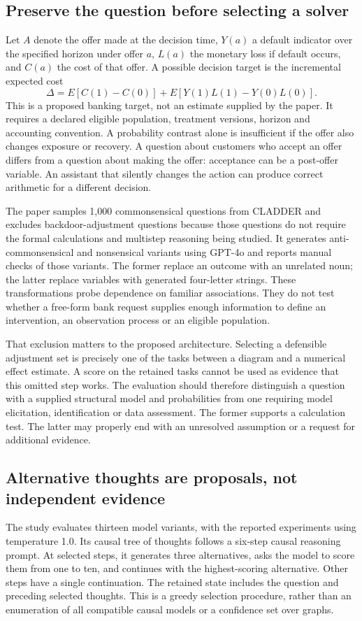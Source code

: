 \subsection{Preserve the question before selecting a solver}
\label{exec21:prophets-question}
Let $A$ denote the offer made at the decision time, $Y(a)$ a default indicator
over the specified horizon under offer $a$, $L(a)$ the monetary loss if default
occurs, and $C(a)$ the cost of that offer. A possible decision target is the
incremental expected cost
\[
 \Delta=E[C(1)-C(0)]+E[Y(1)L(1)-Y(0)L(0)].
\]
This is a proposed banking target, not an estimate supplied by the paper. It
requires a declared eligible population, treatment versions, horizon and
accounting convention. A probability contrast alone is insufficient if the
offer also changes exposure or recovery. A question about customers who accept
an offer differs from a question about making the offer: acceptance can be a
post-offer variable. An assistant that silently changes the action can produce
correct arithmetic for a different decision.

The paper samples 1,000 commonsensical questions from CLADDER and excludes
backdoor-adjustment questions because those questions do not require the
formal calculations and multistep reasoning being studied. It generates
anti-commonsensical and nonsensical variants using GPT-4o and reports manual
checks of those variants. The former replace an outcome with an unrelated
noun; the latter replace variables with generated four-letter strings. These
transformations probe dependence on familiar associations. They do not test
whether a free-form bank request supplies enough information to define an
intervention, an observation process or an eligible population.
\citep{exec21_prophets}

That exclusion matters to the proposed architecture. Selecting a defensible
adjustment set is precisely one of the tasks between a diagram and a numerical
effect estimate. A score on the retained tasks cannot be used as evidence that
this omitted step works. The evaluation should therefore distinguish a
question with a supplied structural model and probabilities from one requiring
model elicitation, identification or data assessment. The former supports a
calculation test. The latter may properly end with an unresolved assumption or
a request for additional evidence.

\subsection{Alternative thoughts are proposals, not independent evidence}
\label{exec21:prophets-search}
The study evaluates thirteen model variants, with the reported experiments
using temperature 1.0. Its causal tree of thoughts follows a six-step causal
reasoning prompt. At selected steps, it generates three alternatives, asks the
model to score them from one to ten, and continues with the highest-scoring
alternative. Other steps have a single continuation. The retained state includes
the question and preceding selected thoughts. This is a greedy selection
procedure, rather than an enumeration of all compatible causal models or a
confidence set over graphs.~\citep{exec21_prophets}

